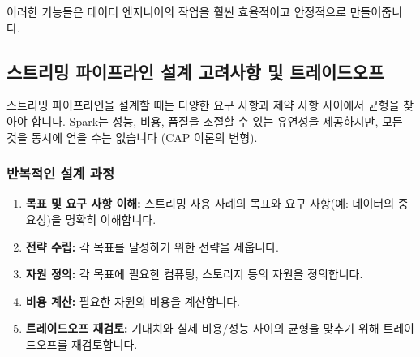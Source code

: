 \documentclass[11pt,a4paper]{article}
\begin{document}
이러한 기능들은 데이터 엔지니어의 작업을 훨씬 효율적이고 안정적으로 만들어줍니다.

\subsection{스트리밍 파이프라인 설계 고려사항 및 트레이드오프}

스트리밍 파이프라인을 설계할 때는 다양한 요구 사항과 제약 사항 사이에서 균형을 찾아야 합니다. Spark는 성능, 비용, 품질을 조절할 수 있는 유연성을 제공하지만, 모든 것을 동시에 얻을 수는 없습니다 (CAP 이론의 변형).

\subsubsection{반복적인 설계 과정}
\begin{enumerate}
    \item \textbf{목표 및 요구 사항 이해:} 스트리밍 사용 사례의 목표와 요구 사항(예: 데이터의 중요성)을 명확히 이해합니다.
    \item \textbf{전략 수립:} 각 목표를 달성하기 위한 전략을 세웁니다.
    \item \textbf{자원 정의:} 각 목표에 필요한 컴퓨팅, 스토리지 등의 자원을 정의합니다.
    \item \textbf{비용 계산:} 필요한 자원의 비용을 계산합니다.
    \item \textbf{트레이드오프 재검토:} 기대치와 실제 비용/성능 사이의 균형을 맞추기 위해 트레이드오프를 재검토합니다.
\end{enumerate}
\end{document}
